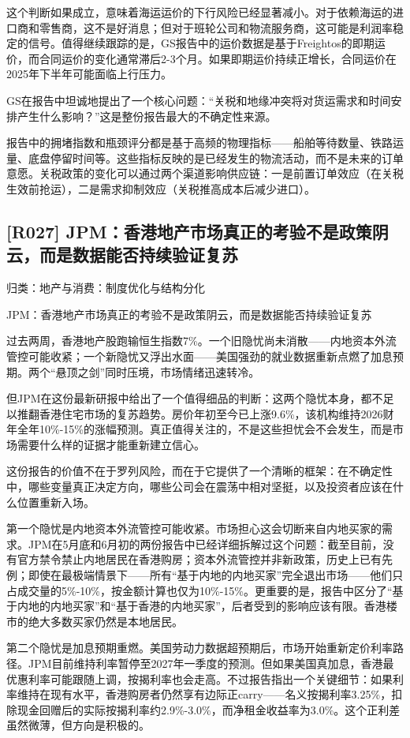 \documentclass[11pt]{ctexart}
\begin{document}
这个判断如果成立，意味着海运运价的下行风险已经显著减小。对于依赖海运的进口商和零售商，这不是好消息；但对于班轮公司和物流服务商，这可能是利润率稳定的信号。值得继续跟踪的是，GS报告中的运价数据是基于Freightos的即期运价，而合同运价的变化通常滞后2-3个月。如果即期运价持续正增长，合同运价在2025年下半年可能面临上行压力。

GS在报告中坦诚地提出了一个核心问题：“关税和地缘冲突将对货运需求和时间安排产生什么影响？”这是整份报告最大的不确定性来源。

报告中的拥堵指数和瓶颈评分都是基于高频的物理指标——船舶等待数量、铁路运量、底盘停留时间等。这些指标反映的是已经发生的物流活动，而不是未来的订单意愿。关税政策的变化可以通过两个渠道影响供应链：一是前置订单效应（在关税生效前抢运），二是需求抑制效应（关税推高成本后减少进口）。

\subsection{[R027] JPM：香港地产市场真正的考验不是政策阴云，而是数据能否持续验证复苏}
{\small\color{refgray}归类：地产与消费：制度优化与结构分化}

JPM：香港地产市场真正的考验不是政策阴云，而是数据能否持续验证复苏

过去两周，香港地产股跑输恒生指数7\%。一个旧隐忧尚未消散——内地资本外流管控可能收紧；一个新隐忧又浮出水面——美国强劲的就业数据重新点燃了加息预期。两个“悬顶之剑”同时压境，市场情绪迅速转冷。

但JPM在这份最新研报中给出了一个值得细品的判断：这两个隐忧本身，都不足以推翻香港住宅市场的复苏趋势。房价年初至今已上涨9.6\%，该机构维持2026财年全年10\%-15\%的涨幅预测。真正值得关注的，不是这些担忧会不会发生，而是市场需要什么样的证据才能重新建立信心。

这份报告的价值不在于罗列风险，而在于它提供了一个清晰的框架：在不确定性中，哪些变量真正决定方向，哪些公司会在震荡中相对坚挺，以及投资者应该在什么位置重新入场。

第一个隐忧是内地资本外流管控可能收紧。市场担心这会切断来自内地买家的需求。JPM在5月底和6月初的两份报告中已经详细拆解过这个问题：截至目前，没有官方禁令禁止内地居民在香港购房；资本外流管控并非新政策，历史上已有先例；即使在最极端情景下——所有“基于内地的内地买家”完全退出市场——他们只占成交量的5\%-10\%，按金额计算也仅为10\%-15\%。更重要的是，报告中区分了“基于内地的内地买家”和“基于香港的内地买家”，后者受到的影响应该有限。香港楼市的绝大多数买家仍然是本地居民。

第二个隐忧是加息预期重燃。美国劳动力数据超预期后，市场开始重新定价利率路径。JPM目前维持利率暂停至2027年一季度的预测。但如果美国真加息，香港最优惠利率可能跟随上调，按揭利率也会走高。不过报告指出一个关键细节：如果利率维持在现有水平，香港购房者仍然享有边际正carry——名义按揭利率3.25\%，扣除现金回赠后的实际按揭利率约2.9\%-3.0\%，而净租金收益率为3.0\%。这个正利差虽然微薄，但方向是积极的。
\end{document}
